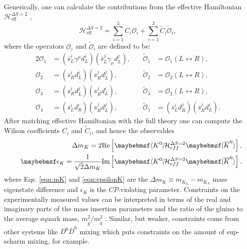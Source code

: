 \begin{enumerate}
\begin{enumerate*}
\begin{center}
\label{fig:KKmixing}
\end{center}
Generically, one can calculate the contributions from the effective Hamiltonian $\mathcal{H}^{\Delta S=2}_{\text{eff}}$ \cite{RN670,RN673,RN674},
\begin{equation}
\mathcal{H}^{\Delta S=2}_{\text{eff}}=\sum_{i=1}^{5}C_{i}\mathcal{O}_{i}+\sum_{i=1}^{3}\tilde{C}_{i}\tilde{\mathcal{O}}_{i},
\end{equation}
where the operators $\mathcal{O}_i$ and $\tilde{\mathcal{O}}_i$ are defined to be:
\begin{alignat}{2}
\mathcal{O}_{1}&=(\overline{s}^{i}_{L}\gamma^{\mu}d^{i}_{L})(\overline{s}^{j}_{L}\gamma_{\mu}d^{j}_{L}),& \quad \tilde{\mathcal{O}}_{1}&=\mathcal{O}_{1}(L \leftrightarrow R), \\
\mathcal{O}_{2}&=(\overline{s}^{i}_{R}d^{i}_{L})(\overline{s}^{j}_{R}d^{j}_{L}),& \quad \tilde{\mathcal{O}}_{2}&=\mathcal{O}_{2}(L \leftrightarrow R), \\
\mathcal{O}_{3}&=(\overline{s}^{i}_{R}d^{j}_{L})(\overline{s}^{j}_{R}d^{i}_{L}),& \quad \tilde{\mathcal{O}}_{3}&=\mathcal{O}_{2}(L \leftrightarrow R), \\
\mathcal{O}_{4}&=(\overline{s}^{i}_{L}d^{i}_{R})(\overline{s}^{j}_{R}d^{j}_{L}),& \quad \tilde{\mathcal{O}}_{5}&=(\overline{s}^{i}_{L}d^{j}_{R})(\overline{s}^{j}_{R}d^{i}_{L}). 
\end{alignat}
After matching effective Hamiltonian with the full theory one can compute the Wilson coefficients $C_i$ and $\tilde{C}_i$, and hence the observables
\begin{eqnarray}
&&\Delta m_{K}=2 \text{Re}\left[ \bra{K^{0}} \mathcal{H}^{\Delta S=2}_{eff} \ket{\overline{K}^{0}} \right] \label{eqn:mK},\\
&&\epsilon_{K}=\frac{1}{\sqrt{2}\Delta m_{K}}\text{Im}\left[ \bra{K^{0}} \mathcal{H}^{\Delta S=2}_{eff} \ket{\overline{K}^{0}} \right]. \label{eqn:epsilonK}
\end{eqnarray}
where Eqs. \ref{eqn:mK} and \ref{eqn:epsilonK} are the $\Delta m_K \equiv m_{K_{L}}-m_{K_{S}}$ mass eigenstate difference and $\epsilon_{K}$ is the $CP$-violating parameter. Constraints on the experimentally measured values can be interpreted in terms of the real and imaginary parts of the mass insertion parameters and the ratio of the gluino to the average squark mass, $m^2_{\tilde{g}}/m^2_{\tilde{q}}$ \cite{RN670}. Similar, but weaker, constraints come from other systems like $D^{0}\overline{D}^{0}$ mixing which puts constraints on the amount of sup-scharm mixing, for example.


\end{enumerate*}
\end{enumerate}
